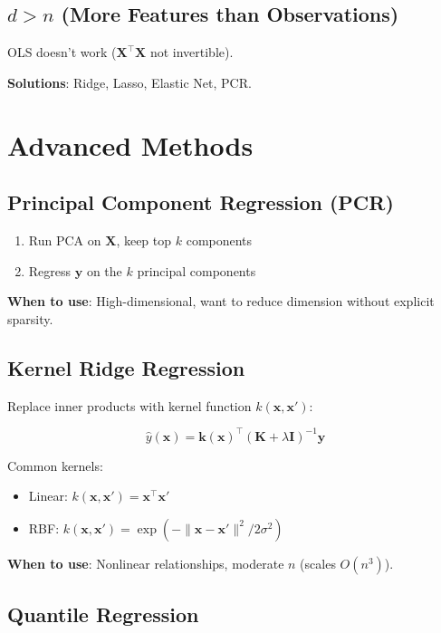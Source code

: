 \documentclass[main.tex]{subfiles}
\begin{document}
\subsection{$d > n$ (More Features than Observations)}

OLS doesn't work ($\mathbf{X}^\top\mathbf{X}$ not invertible).

\textbf{Solutions}: Ridge, Lasso, Elastic Net, PCR.

\section{Advanced Methods}

\subsection{Principal Component Regression (PCR)}

\begin{enumerate}
    \item Run PCA on $\mathbf{X}$, keep top $k$ components
    \item Regress $\mathbf{y}$ on the $k$ principal components
\end{enumerate}

\textbf{When to use}: High-dimensional, want to reduce dimension without explicit sparsity.

\subsection{Kernel Ridge Regression}

Replace inner products with kernel function $k(\mathbf{x}, \mathbf{x}')$:

$$\hat{y}(\mathbf{x}) = \mathbf{k}(\mathbf{x})^\top(\mathbf{K} + \lambda\mathbf{I})^{-1}\mathbf{y}$$

Common kernels:
\begin{itemize}
    \item Linear: $k(\mathbf{x}, \mathbf{x}') = \mathbf{x}^\top\mathbf{x}'$
    \item RBF: $k(\mathbf{x}, \mathbf{x}') = \exp(-\|\mathbf{x} - \mathbf{x}'\|^2/2\sigma^2)$
\end{itemize}

\textbf{When to use}: Nonlinear relationships, moderate $n$ (scales $O(n^3)$).

\subsection{Quantile Regression}
\end{document}
